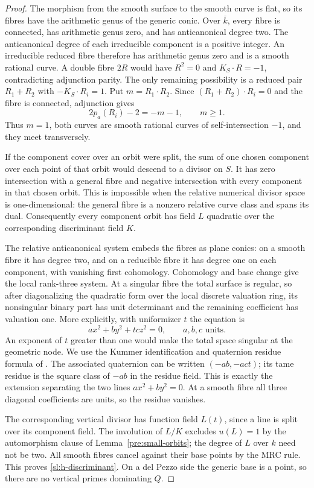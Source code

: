 \begin{proof}
The morphism from the smooth surface to the smooth curve is flat,
so its fibres have the arithmetic genus of the generic conic.
Over $\overline k$, every fibre is connected, has arithmetic genus zero,
and has anticanonical degree two.  The anticanonical degree of each
irreducible component is a positive integer.  An irreducible reduced
fibre therefore has arithmetic genus zero and is a smooth rational curve.
A double fibre $2R$ would have $R^2=0$ and $K_S\cdot R=-1$, contradicting
adjunction parity.  The only remaining possibility is a reduced pair
$R_1+R_2$ with $-K_S\cdot R_i=1$.  Put $m=R_1\cdot R_2$.  Since
$(R_1+R_2)\cdot R_i=0$ and the fibre is connected, adjunction gives
\[
 2p_a(R_i)-2=-m-1,\qquad m\geq1.
\]
Thus $m=1$, both curves are smooth rational curves of self-intersection
$-1$, and they meet transversely.

If the component cover over an orbit were split, the sum of one chosen
component over each point of that orbit would descend to a divisor on
$S$.  It has zero intersection with a general fibre and negative
intersection with every component in that chosen orbit.  This is
impossible when the relative numerical divisor space is one-dimensional:
the general fibre is a nonzero relative curve class and spans its dual.
Consequently every component orbit has field $L$ quadratic over the
corresponding discriminant field $K$.

The relative anticanonical system embeds the fibres as plane conics:
on a smooth fibre it has degree two, and on a reducible fibre it has
degree one on each component, with vanishing first cohomology.  Cohomology
and base change give the local rank-three system.  At a singular fibre
the total surface is regular, so after diagonalizing the quadratic form
over the local discrete valuation ring, its nonsingular binary part has
unit determinant and the remaining coefficient has valuation one.
More explicitly, with uniformizer $t$ the equation is
\[
 ax^2+by^2+tc z^2=0,\qquad a,b,c\text{ units}.
\]
An exponent of $t$ greater than one would make the total space singular
at the geometric node. We use the Kummer identification and quaternion
residue formula of \cite[\S2, equations~(1)--(4)]{AuelBohningBothmerPirutka20}.
The associated quaternion can be written
$(-ab,-act)$; its tame residue is the square class of $-ab$ in the
residue field.  This is exactly the extension separating the two lines
$ax^2+by^2=0$.  At a smooth fibre all three diagonal coefficients are
units, so the residue vanishes.

The corresponding vertical divisor has function field $L(t)$, since a
line is split over its component field.  The involution of $L/K$ excludes
$u(L)=1$ by the automorphism clause of Lemma~\ref{pre:small-orbits};
the degree of $L$ over $k$ need not be two.  All smooth
fibres cancel against their base points by the MRC rule.  This proves
\eqref{sl:h-discriminant}.  On a del Pezzo side the generic base is a
point, so there are no vertical primes dominating $Q$.
\end{proof}

